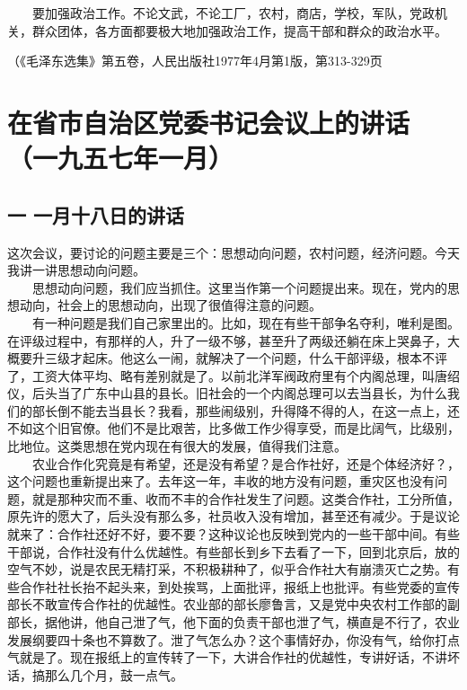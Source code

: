 \documentclass[cn,11pt,chinese]{elegantbook}
\def\myformat#1{\hfil\hfil #1}
\begin{document}
　　要加强政治工作。不论文武，不论工厂，农村，商店，学校，军队，党政机关，群众团体，各方面都要极大地加强政治工作，提高干部和群众的政治水平。\\
\begin{flushright}（《毛泽东选集》第五卷，人民出版社1977年4月第1版，第313-329页\end{flushright}
\newpage\section*{\myformat{在省市自治区党委书记会议上的讲话}\\\myformat{（一九五七年一月）}}
\subsection*{\myformat{一 一月十八日的讲话}}
这次会议，要讨论的问题主要是三个：思想动向问题，农村问题，经济问题。今天我讲一讲思想动向问题。\\
　　思想动向问题，我们应当抓住。这里当作第一个问题提出来。现在，党内的思想动向，社会上的思想动向，出现了很值得注意的问题。\\
　　有一种问题是我们自己家里出的。比如，现在有些干部争名夺利，唯利是图。在评级过程中，有那样的人，升了一级不够，甚至升了两级还躺在床上哭鼻子，大概要升三级才起床。他这么一闹，就解决了一个问题，什么干部评级，根本不评了，工资大体平均、略有差别就是了。以前北洋军阀政府里有个内阁总理，叫唐绍仪，后头当了广东中山县的县长。旧社会的一个内阁总理可以去当县长，为什么我们的部长倒不能去当县长？我看，那些闹级别，升得降不得的人，在这一点上，还不如这个旧官僚。他们不是比艰苦，比多做工作少得享受，而是比阔气，比级别，比地位。这类思想在党内现在有很大的发展，值得我们注意。\\
　　农业合作化究竟是有希望，还是没有希望？是合作社好，还是个体经济好？，这个问题也重新提出来了。去年这一年，丰收的地方没有问题，重灾区也没有问题，就是那种灾而不重、收而不丰的合作社发生了问题。这类合作社，工分所值，原先许的愿大了，后头没有那么多，社员收入没有增加，甚至还有减少。于是议论就来了：合作社还好不好，要不要？这种议论也反映到党内的一些干部中间。有些干部说，合作社没有什么优越性。有些部长到乡下去看了一下，回到北京后，放的空气不妙，说是农民无精打采，不积极耕种了，似乎合作社大有崩溃灭亡之势。有些合作社社长抬不起头来，到处挨骂，上面批评，报纸上也批评。有些党委的宣传部长不敢宣传合作社的优越性。农业部的部长廖鲁言，又是党中央农村工作部的副部长，据他讲，他自己泄了气，他下面的负责干部也泄了气，横直是不行了，农业发展纲要四十条也不算数了。泄了气怎么办？这个事情好办，你没有气，给你打点气就是了。现在报纸上的宣传转了一下，大讲合作社的优越性，专讲好话，不讲坏话，搞那么几个月，鼓一点气。\\
\end{document}
